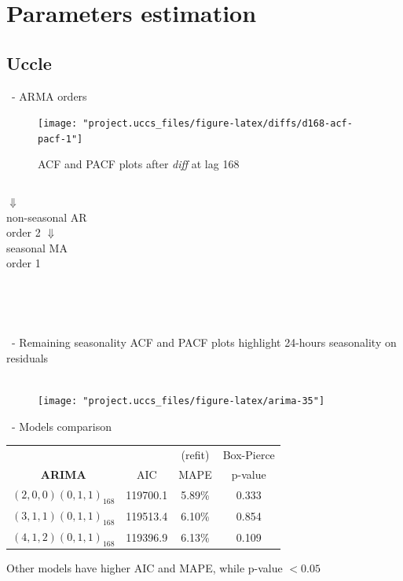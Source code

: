\documentclass{beamer}
\begin{document}
\section{Parameters estimation}
\subsection{Uccle}

\begin{frame}{\subsecname~- ARMA orders}
	\begin{figure}[h]
		\centering
		\caption{ACF and PACF plots after \textit{diff} at lag 168}
		\texttt{[image: "project.uccs\_files/figure-latex/diffs/d168-acf-pacf-1"]}
	\end{figure}
	\begin{columns}
		\centering
		$\Downarrow$\\
		non-seasonal AR\\
		order 2
		\centering
		$\Downarrow$\\
		seasonal MA\\
		order 1
	\end{columns}~\\~
\end{frame}

\begin{frame}{\subsecname~- Remaining seasonality}
	\centering
	ACF and PACF plots highlight 24-hours seasonality on residuals\\~
	\begin{figure}[h]
		\centering
		\texttt{[image: "project.uccs\_files/figure-latex/arima-35"]}
	\end{figure}
\end{frame}

\begin{frame}{\subsecname~- Models comparison}
	\begin{table}
		\begin{tabular}{c | c c c}
			               &     & (refit) & Box-Pierce \\
			\textbf{ARIMA} & AIC & MAPE    & p-value \\
			\midrule
			$(2,0,0)(0,1,1)_{168}$ & 119700.1 & 5.89\% & 0.333 \\
			$(3,1,1)(0,1,1)_{168}$ & 119513.4 & 6.10\% & 0.854 \\
			$(4,1,2)(0,1,1)_{168}$ & 119396.9 & 6.13\% & 0.109\\
		\end{tabular}
	\end{table}
	\vspace{0.1\textheight}\centering
	Other models have higher AIC and MAPE, while p-value $< 0.05$
\end{frame}
\end{document}
